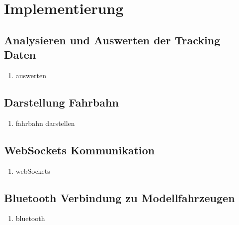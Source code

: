 \chapter{Implementierung}
\label{sec:Impl}
\section{Analysieren und Auswerten der Tracking Daten}
\begin{enumerate}
\item auswerten
\end{enumerate}

\section{Darstellung Fahrbahn}
\begin{enumerate}
\item fahrbahn darstellen
\end{enumerate}

\section{WebSockets Kommunikation}
\begin{enumerate}
\item webSockets
\end{enumerate}

\section{Bluetooth Verbindung zu Modellfahrzeugen}
\begin{enumerate}
\item bluetooth
\end{enumerate}